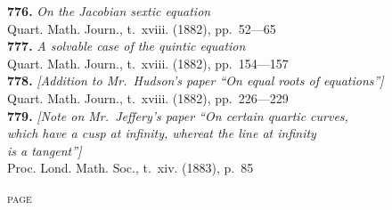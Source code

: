 \documentclass[12pt,a4paper,oneside]{book}
\begin{document}
\textbf{776.} \textit{On the Jacobian sextic equation} \\
\hspace*{2em}Quart. Math. Journ., t.~xviii. (1882), pp.~52---65\\[0.4em]
\textbf{777.} \textit{A solvable case of the quintic equation} \\
\hspace*{2em}Quart. Math. Journ., t.~xviii. (1882), pp.~154---157\\[0.4em]
\textbf{778.} \textit{[Addition to Mr.~Hudson's paper ``On equal roots of equations'']} \\
\hspace*{2em}Quart. Math. Journ., t.~xviii. (1882), pp.~226---229\\[0.4em]
\textbf{779.} \textit{[Note on Mr.~Jeffery's paper ``On certain quartic curves,}\\
\hspace*{2em}\textit{which have a cusp at infinity, whereat the line at infinity}\\
\hspace*{2em}\textit{is a tangent'']} \\
\hspace*{2em}Proc. Lond. Math. Soc., t.~xiv. (1883), p.~85

\clearpage

\vspace*{1em}

\hfill\textsc{page}
\end{document}
